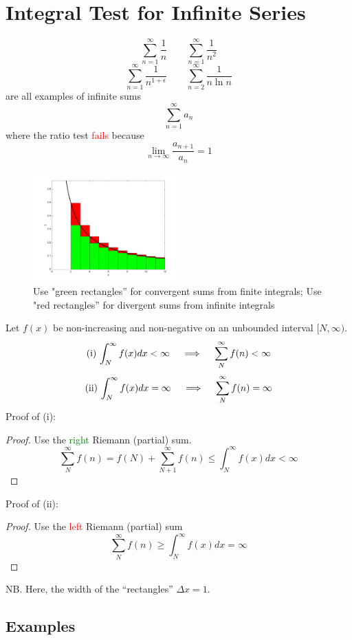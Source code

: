 \documentclass{article}
\begin{document}
\newpage
\section{Integral Test for Infinite Series}

$$
\sum_{n=1}^\infty \frac{1}{n}
\qquad
\sum_{n=1}^\infty \frac{1}{n^2}
$$
$$
\sum_{n=1}^\infty \frac{1}{n^{1+\epsilon}}
\qquad
\sum_{n=2}^\infty \frac{1}{n\ln n}
$$
are all examples of infinite sums
$$
\sum_{n=1}^\infty a_n
$$
where the ratio test \textcolor{red}{fails} because
$$
\lim_{n \rightarrow \infty} \frac{a_{n+1}}{a_n} = 1
$$


\begin{figure}[!ht]
\centering
\includegraphics[width = 0.5\textwidth]{AC3.pdf}
\caption{Use "green rectangles'' for convergent sums from finite integrals; Use "red rectangles'' for divergent sums from infinite integrals}
\end{figure}


Let $f(x)$ be non-increasing and non-negative on an unbounded interval $[N, \infty)$. 
$$
{\rm (i)}\,\int_N^\infty f(x) dx < \infty\quad \implies \quad \sum_N^\infty f(n) < \infty
$$
$$
{\rm (ii)}\,\int_N^\infty f(x) dx  = \infty\quad \implies \quad \sum_N^\infty f(n)  = \infty
$$
Proof of (i):
\begin{proof}
Use the \textcolor{green}{right} Riemann (partial) sum.
$$
\sum_N^\infty f(n) = f(N) + \sum_{N+1}^\infty f(n) \leq \int_N^\infty f(x) dx < \infty
$$
\end{proof}
Proof of (ii): 
\begin{proof}
Use the \textcolor{red}{left} Riemann (partial) sum
$$
\sum_N^\infty f(n) \geq \int_N^\infty f(x) dx = \infty
$$
\end{proof}
NB. Here, the width of the ``rectangles'' $\Delta x = 1$.


\subsection{Examples}
\end{document}
